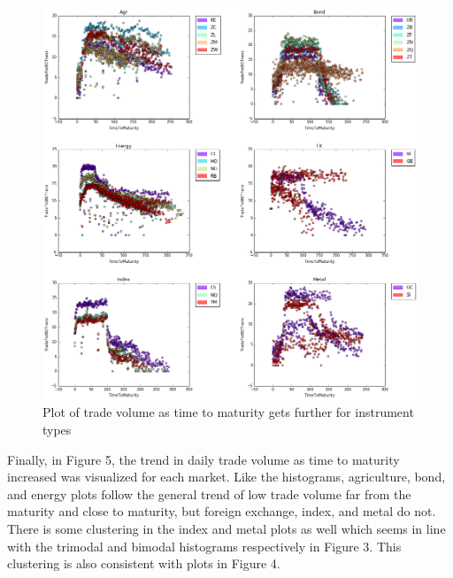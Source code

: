 \documentclass[12pt]{article}
\begin{document}
\begin{figure}[H]
	\begin{center}	
		\includegraphics[width=15cm]{types_time_to_mat.png}
		\caption{Plot of trade volume as time to maturity gets further for instrument types}
		\label{fig:4}
	\end{center}
\end{figure}

Finally, in Figure 5, the trend in daily trade volume as time to maturity increased was visualized for each market. Like the histograms, agriculture, bond, and energy plots follow the general trend of low trade volume far from the maturity and close to maturity, but foreign exchange, index, and metal do not. There is some clustering in the index and metal plots as well which seems in line with the trimodal and bimodal histograms respectively in 
Figure 3. This clustering is also consistent with plots in Figure 4.
\end{document}
